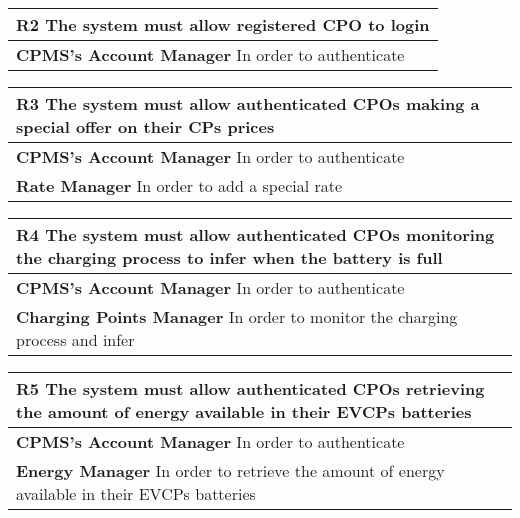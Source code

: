 \begin{table}[H]
    \begin{tabularx}{\textwidth}{X}
        \toprule
        \textbf{R2} The system must allow registered CPO to login                                                       \\ \midrule
        \textbf{CPMS's Account Manager}  In order to authenticate            \\
    \end{tabularx}
\end{table}
\begin{table}[H]
    \begin{tabularx}{\textwidth}{X}
        \toprule
        \textbf{R3} The system must allow authenticated CPOs making a special offer on their CPs prices                                       \\ \midrule
        \textbf{CPMS's Account Manager}   In order to authenticate                                                                                     \\
        \textbf{Rate Manager}  In order to add a special rate       \\
    \end{tabularx}
\end{table}
\begin{table}[H]
    \begin{tabularx}{\textwidth}{X}
        \toprule
        \textbf{R4} The system must allow authenticated CPOs monitoring the charging process to infer when the battery is full                                       \\ \midrule
        \textbf{CPMS's Account Manager}  In order to authenticate                                                                                     \\
        \textbf{Charging Points Manager} In order to monitor the charging process and infer       \\ 
    \end{tabularx}
\end{table}
\begin{table}[H]
    \begin{tabularx}{\textwidth}{X}
        \toprule
        \textbf{R5} The system must allow authenticated CPOs retrieving the amount of energy
        available in their EVCPs batteries \\ \midrule
        \textbf{CPMS's Account Manager}  In order to authenticate                                                                                     \\
        \textbf{Energy Manager}  In order to retrieve the amount of energy available in their EVCPs batteries \\
    \end{tabularx}
\end{table}
